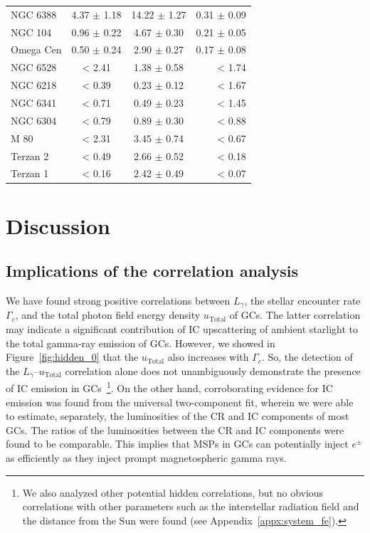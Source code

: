 \documentclass[doublespace,nopageskip]{VTthesis} %
\begin{document}
\begin{table}
\begin{tabular}{lccr}
NGC 6388 & 4.37 $\pm$ 1.18 & 14.22 $\pm$ 1.27 & 0.31 $\pm$ 0.09 \\
NGC 104 & 0.96 $\pm$ 0.22 & 4.67 $\pm$ 0.30 & 0.21 $\pm$ 0.05 \\
Omega Cen & 0.50 $\pm$ 0.24 & 2.90 $\pm$ 0.27 & 0.17 $\pm$ 0.08 \\
NGC 6528 & < 2.41 & 1.38 $\pm$ 0.58 & < 1.74 \\
NGC 6218 & < 0.39  &  0.23 $\pm$ 0.12 & < 1.67 \\
NGC 6341 & < 0.71  &  0.49 $\pm$ 0.23 & < 1.45 \\
NGC 6304 & < 0.79  &  0.89 $\pm$ 0.30 & < 0.88 \\
M 80 & < 2.31  &  3.45 $\pm$ 0.74 & < 0.67 \\
Terzan 2 & < 0.49  &  2.66 $\pm$ 0.52 & < 0.18 \\
Terzan 1 & < 0.16  &  2.42 $\pm$ 0.49 & < 0.07 \\
\bottomrule
    \end{tabular}
    \label{tab:ratio}
\end{table}

\section{Discussion}\label{sec:discussion_GC}

\subsection{Implications of the correlation analysis}

We have found strong positive correlations between $L_\gamma$, the stellar encounter rate $\Gamma_c$, and the total photon field energy density $u_\mathrm{Total}$ of GCs. The latter correlation may indicate a significant contribution of IC upscattering of ambient starlight to the total gamma-ray emission of GCs. However, we showed in Figure~\ref{fig:hidden_0} that the $u_\mathrm{Total}$ also increases with $\Gamma_c$. So, the detection of the $L_\gamma$--$u_\mathrm{Total}$ correlation alone does not unambiguously demonstrate the presence of IC emission in GCs~\footnote{We also analyzed other potential hidden correlations, but no obvious correlations with other parameters such as the interstellar radiation field and the distance from the Sun were found (see Appendix~\ref{appx:system_fe}).}. On the other hand, corroborating evidence for IC emission was found from the universal two-component fit, wherein we were able to estimate, separately, the luminosities of the CR and IC components of most GCs. The ratios of the luminosities between the CR and IC components were found to be comparable. This implies that MSPs in GCs can potentially inject $e^{\pm}$ as efficiently as they inject prompt magnetospheric gamma rays.
\end{document}
